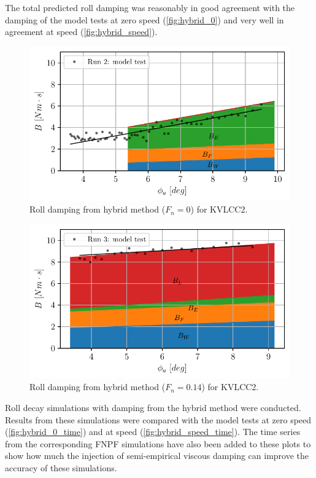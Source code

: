 The total predicted roll damping was reasonably in good agreement with the damping of the model tests at zero speed (\autoref{fig:hybrid_0}) and very well in agreement at speed (\autoref{fig:hybrid_speed}).
\begin{figure}[h]
\begin{center}\includegraphics[width=\textwidth]{figures/hybrid_0.pdf}\end{center}
\caption{Roll damping from hybrid method ($F_n = 0$) for KVLCC2.}
\label{fig:hybrid_0}
\end{figure}
\begin{figure}[h]
\begin{center}\includegraphics[width=\textwidth]{figures/hybrid_speed.pdf}\end{center}
\caption{Roll damping from hybrid method ($F_n = 0.14$) for KVLCC2.}
\label{fig:hybrid_speed}
\end{figure}
Roll decay simulations with damping from the hybrid method were conducted. Results from these simulations were compared with the model tests at zero speed (\autoref{fig:hybrid_0_time}) and at speed (\autoref{fig:hybrid_speed_time}). The time series from the corresponding FNPF
simulations have also been added to these plots to show how much the injection of semi-empirical viscous damping can improve the accuracy of these simulations.

